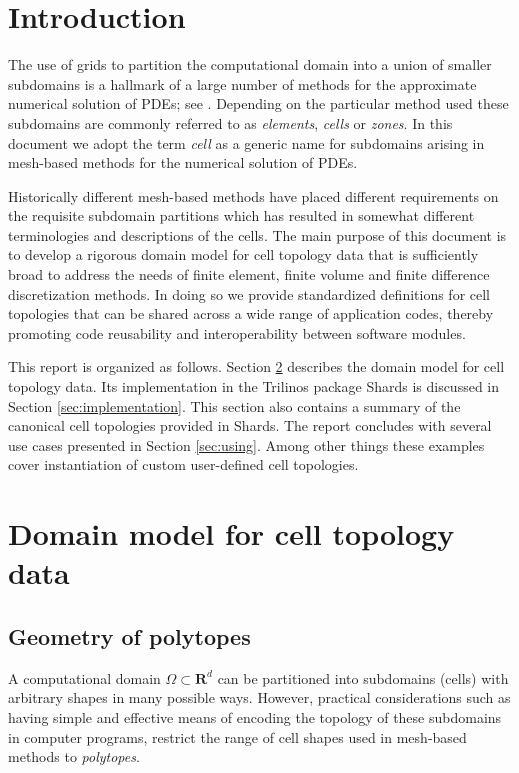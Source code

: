\documentclass[pdf,12pt,relaxed]{SANDreport}
\begin{document}
    \section{Introduction}\label{sec:intro}

The use of grids to partition the computational domain into a union of smaller subdomains is a hallmark of a large number of methods for the approximate numerical solution of PDEs; see \cite{ciarlet,mishaBook,bh:2006}. Depending on the particular method used these subdomains are commonly referred to as \emph{elements}, \emph{cells} or \emph{zones}.  In this document we adopt the term \emph{cell} as a generic name for subdomains arising in mesh-based methods for the numerical solution of PDEs. 

Historically different mesh-based methods have placed different requirements on the requisite subdomain partitions which has resulted in somewhat different terminologies and descriptions of the cells. The main purpose of this document is to develop a rigorous domain model for cell topology data that is sufficiently broad to address the needs of finite element, finite volume and finite difference discretization methods. In doing so we provide standardized definitions for cell topologies that can be shared across a wide range of application codes, thereby promoting code reusability and interoperability between software modules.  

This report is organized as follows. Section \ref{sec:model} describes the domain model for cell topology data. Its implementation in the Trilinos \cite{trilinos} package Shards is discussed in Section \ref{sec:implementation}. This section also contains a summary of the canonical cell topologies provided in Shards. The report concludes with several use cases presented in Section \ref{sec:using}. Among other things these examples cover instantiation of custom user-defined cell topologies.


    \section{Domain model for cell topology data}\label{sec:model}
    
    \subsection{Geometry of polytopes}
    A computational domain $\Omega\subset \mathbf{R}^d$ can be partitioned into subdomains (cells) with arbitrary shapes in many possible ways. However, practical considerations such as having simple and effective means of encoding the topology of these subdomains in  computer programs, restrict the range of cell shapes used in mesh-based methods  to \emph{polytopes}. 
 
\end{document}
